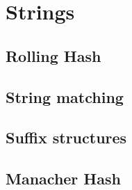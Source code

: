 \chapter{Strings}

\section{Rolling Hash}
\section{String matching}
\section{Suffix structures}
\section{Manacher Hash}
